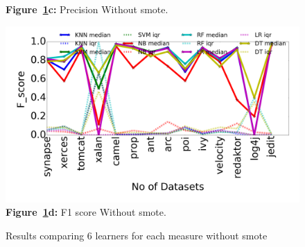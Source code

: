 \documentclass[conference]{IEEEtran}
\begin{document}
\begin{figure}[!htbp]
\begin{minipage}[b]{0.49\linewidth}
\begin{center}
  {\bf Figure~\ref{fig:nosmote}c:} Precision Without smote.
  \end{center}
    \end{minipage}
    \begin{minipage}[b]{0.49\linewidth}
        \begin{center}
        \includegraphics[width=\linewidth]{F_score_nosmote.png}
  {\bf Figure~\ref{fig:nosmote}d:} F1 score Without smote.
  \end{center}
    \end{minipage}
    \caption{Results comparing 6 learners for each measure without smote}\label{fig:nosmote}
\end{figure}
\end{document}
